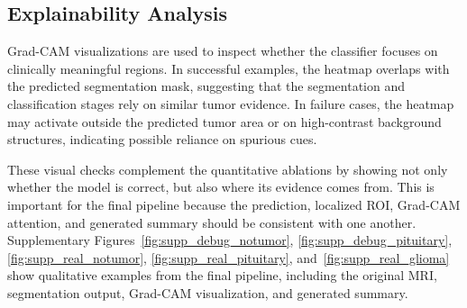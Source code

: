 \subsection{Explainability Analysis}
Grad-CAM visualizations are used to inspect whether the classifier focuses on clinically meaningful regions. In successful examples, the heatmap overlaps with the predicted segmentation mask, suggesting that the segmentation and classification stages rely on similar tumor evidence. In failure cases, the heatmap may activate outside the predicted tumor area or on high-contrast background structures, indicating possible reliance on spurious cues.

These visual checks complement the quantitative ablations by showing not only whether the model is correct, but also where its evidence comes from. This is important for the final pipeline because the prediction, localized ROI, Grad-CAM attention, and generated summary should be consistent with one another.
Supplementary Figures~\ref{fig:supp_debug_notumor}, \ref{fig:supp_debug_pituitary}, \ref{fig:supp_real_notumor}, \ref{fig:supp_real_pituitary}, and~\ref{fig:supp_real_glioma} show qualitative examples from the final pipeline, including the original MRI, segmentation output, Grad-CAM visualization, and generated summary.




